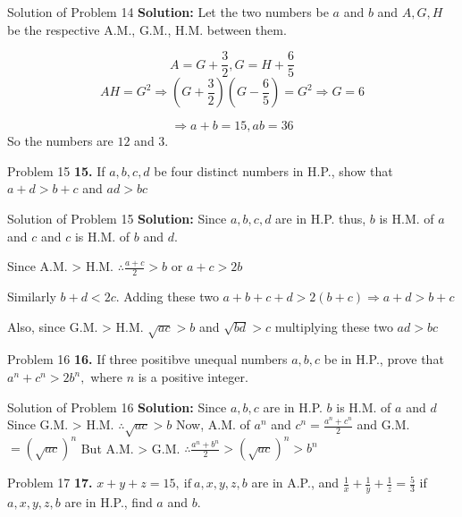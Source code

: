 \documentclass[aspectratio=1610,8pt]{beamer}
\begin{document}
\begin{frame}{Solution of Problem 14}
  \textbf{Solution:} Let the two numbers be $a$ and $b$ and $A, G, H$ be the
  respective A.M., G.M., H.M. between them.

  $$A = G + \frac{3}{2}, G = H + \frac{6}{5}$$
  $$AH = G^2 \Rightarrow \left(G + \frac{3}{2}\right)\left(G - \frac{6}{5}\right) = G^2\Rightarrow G
  = 6$$

  $$\Rightarrow a + b = 15, ab = 36$$
  So the numbers are $12$ and $3.$
\end{frame}
\begin{frame}{Problem 15}
  \textbf{15.} If $a, b, c, d$ be four distinct numbers in H.P., show that $a +
  d > b + c$ and $ad > bc$
\end{frame}
\begin{frame}{Solution of Problem 15}
  \textbf{Solution:} Since $a, b, c, d$ are in H.P. thus, $b$ is H.M. of $a$
  and $c$ and $c$ is H.M. of $b$ and $d.$

  Since A.M. > H.M. $\therefore \frac{a + c}{2} > b$ or $a + c > 2b$

  Similarly $b + d < 2c.$ Adding these two $a + b + c + d > 2(b + c)
  \Rightarrow a + d > b + c$

  Also, since G.M. > H.M. $\sqrt{ac} > b$ and $\sqrt{bd} > c$ multiplying these
  two $ad > bc$
\end{frame}
\begin{frame}{Problem 16}
  \textbf{16.} If three positibve unequal numbers $a, b, c$ be in H.P., prove
  that $a^n + c^n > 2b^n,$ where $n$ is a positive integer.
\end{frame}
\begin{frame}{Solution of Problem 16}
  \textbf{Solution:} Since $a, b, c$ are in H.P. $b$ is H.M. of $a$ and $d$
  \linebreak\linebreak
  Since G.M. > H.M. $\therefore \sqrt{ac} > b$
  \linebreak\linebreak
  Now, A.M. of $a^n$ and $c^n = \frac{a^n + c^n}{2}$ and G.M. $= (\sqrt{ac})^n$
  \linebreak\linebreak
  But A.M. > G.M. $\therefore \frac{a^n + b^n}{2} > (\sqrt{ac})^n > b^n$
\end{frame}
\begin{frame}{Problem 17}
  \textbf{17.} $x + y + z = 15,~\text{if}~a, x, y , z, b$ are in A.P., and
  $\frac{1}{x} + \frac{1}{y} + \frac{1}{z} = \frac{5}{3}$ if $a, x, y, z, b$
  are in H.P., find $a$ and $b.$
\end{frame}
\end{document}

